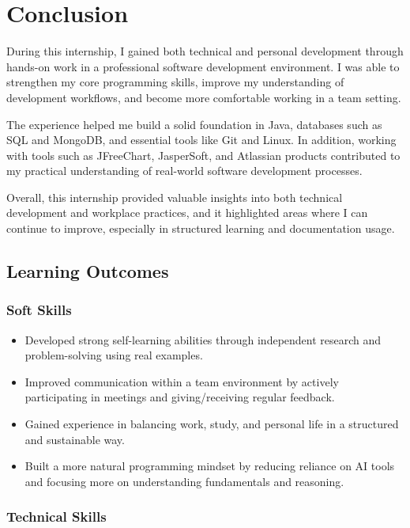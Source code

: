 \chapter{Conclusion}
During this internship, I gained both technical and personal development through hands-on work in a professional software development environment. I was able to strengthen my core programming skills, improve my understanding of development workflows, and become more comfortable working in a team setting.

The experience helped me build a solid foundation in Java, databases such as SQL and MongoDB, and essential tools like Git and Linux. In addition, working with tools such as JFreeChart, JasperSoft, and Atlassian products contributed to my practical understanding of real-world software development processes.

Overall, this internship provided valuable insights into both technical development and workplace practices, and it highlighted areas where I can continue to improve, especially in structured learning and documentation usage.

\section{Learning Outcomes}

\subsection{Soft Skills}
\begin{itemize}
    \item Developed strong self-learning abilities through independent research and problem-solving using real examples.
    \item Improved communication within a team environment by actively participating in meetings and giving/receiving regular feedback.
    \item Gained experience in balancing work, study, and personal life in a structured and sustainable way.
    \item Built a more natural programming mindset by reducing reliance on AI tools and focusing more on understanding fundamentals and reasoning.
\end{itemize}


\subsection{Technical Skills}

